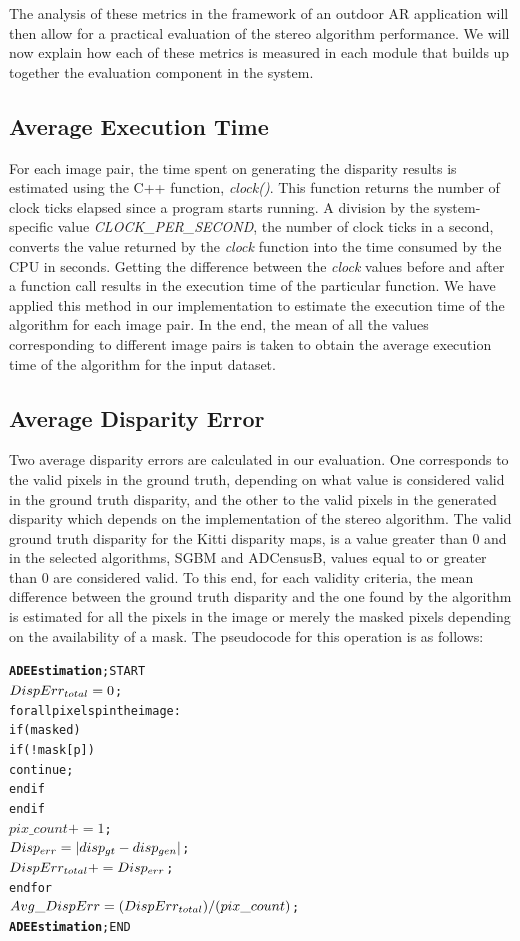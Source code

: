 The analysis of these metrics in the framework of an outdoor AR application will then allow for a practical evaluation of the stereo algorithm performance.
We will now explain how each of these metrics is measured in each module that builds up together the evaluation component in the system.

\subsection{Average Execution Time}
For each image pair, the time spent on generating the disparity results is estimated using the C++ function, \textit{clock()}. 
This function returns the number of clock ticks elapsed
since a program starts running. A division by the system-specific value \textit{CLOCK\_PER\_SECOND}, the number of clock ticks in a second, 
converts the value returned by the \textit{clock} function into the time consumed by the CPU in seconds.
Getting the difference between the \textit{clock} values before and after a function call results in the execution time
of the particular function. 
We have applied this method in our implementation to estimate the execution time of the algorithm for each image pair. In the end, the mean of all
the values corresponding to different image pairs is taken to obtain the average execution time of the algorithm for the input dataset.

\subsection{Average Disparity Error}
Two average disparity errors are calculated in our evaluation. One corresponds to the valid pixels in the ground truth, depending on what value is considered valid
in the ground truth disparity, and the other to
the valid pixels in the generated disparity which depends on the implementation of the stereo algorithm.
The valid ground truth disparity for the Kitti disparity maps, is a value greater than 0 and in the selected algorithms, SGBM and ADCensusB, 
values equal to or greater than 0 are considered valid.
To this end, for each validity criteria, the mean difference between the ground truth disparity and the one found by the algorithm
is estimated for all the pixels in the image or merely the masked pixels depending on the availability of a mask. 
The pseudocode for this operation is as follows:

\begin{alltt}
\textbf{ADE Estimation}; START
   \(DispErr\sb{total}=0\);
   for all pixels p in the image:
      if (masked)
         if(!mask[p]) 
            continue; 
         end if
      end if
      \(pix\_count += 1\);
      \(Disp\sb{err} = |disp\sb{gt}-disp\sb{gen}|\);
      \(DispErr\sb{total} += Disp\sb{err}\);
  end for
   \(Avg\_DispErr = (DispErr\sb{total})/(pix\_count)\);
\textbf{ADE Estimation}; END
\end{alltt}

